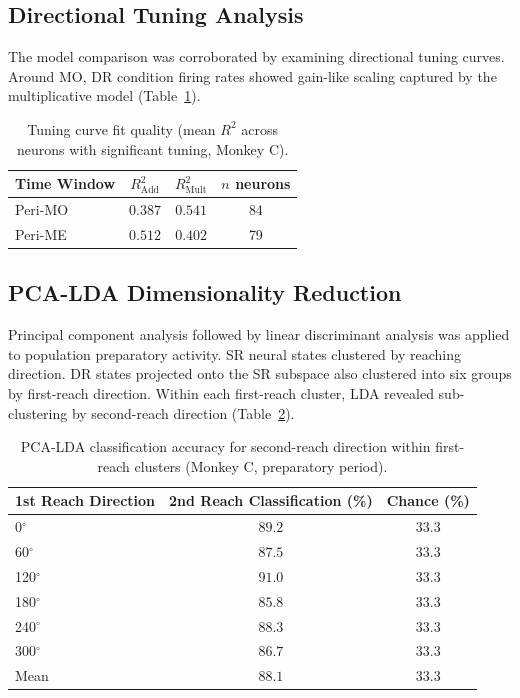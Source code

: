 \documentclass[11pt]{article}
\begin{document}
\subsection{Directional Tuning Analysis}

The model comparison was corroborated by examining directional tuning curves. Around MO, DR condition firing rates showed gain-like scaling captured by the multiplicative model (Table~\ref{tab:tuning}).

\begin{table}[H]
\centering
\caption{Tuning curve fit quality (mean $R^2$ across neurons with significant tuning, Monkey C).}
\label{tab:tuning}
\begin{tabular}{@{}lccc@{}}
\toprule
Time Window & $R^2_\text{Add}$ & $R^2_\text{Mult}$ & $n$ neurons \\
\midrule
Peri-MO & $0.387$ & $\mathbf{0.541}$ & 84 \\
Peri-ME & $\mathbf{0.512}$ & $0.402$ & 79 \\
\bottomrule
\end{tabular}
\end{table}

\subsection{PCA-LDA Dimensionality Reduction}

Principal component analysis followed by linear discriminant analysis \citep{cunningham2014dimensionality} was applied to population preparatory activity. SR neural states clustered by reaching direction. DR states projected onto the SR subspace also clustered into six groups by first-reach direction. Within each first-reach cluster, LDA revealed sub-clustering by second-reach direction (Table~\ref{tab:pca}).

\begin{table}[H]
\centering
\caption{PCA-LDA classification accuracy for second-reach direction within first-reach clusters (Monkey C, preparatory period).}
\label{tab:pca}
\begin{tabular}{@{}lcc@{}}
\toprule
1st Reach Direction & 2nd Reach Classification (\%) & Chance (\%) \\
\midrule
0$^\circ$ & $\mathbf{89.2}$ & $33.3$ \\
60$^\circ$ & $\mathbf{87.5}$ & $33.3$ \\
120$^\circ$ & $\mathbf{91.0}$ & $33.3$ \\
180$^\circ$ & $\mathbf{85.8}$ & $33.3$ \\
240$^\circ$ & $\mathbf{88.3}$ & $33.3$ \\
300$^\circ$ & $\mathbf{86.7}$ & $33.3$ \\
\midrule
Mean & $\mathbf{88.1}$ & $33.3$ \\
\bottomrule
\end{tabular}
\end{table}
\end{document}
